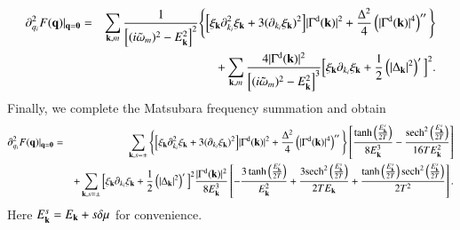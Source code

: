 \documentclass[aps,prd,amsmath,two column,nofootinbib,amssymb,referee]{revtex4}
\begin{document}
\begin{widetext}
\begin{eqnarray}\label{F2}
\partial_{q_i}^2F({\bf q})|_{\bf q=0}
&=&\sum_{{\bf k},m}{1\over\Big[(i\tilde\omega_m)^2-E_{\bf k}^2\Big]^2}\Bigg\{\Big[\xi_{\bf k}\partial_{k_i}^2\xi_{\bf k}+3(\partial_{k_i}\xi_{\bf k})^2\Big]|\Gamma^{\rm d}({\bf k})|^2+{\Delta^2\over4}\left(|\Gamma^{\rm d}({\bf k})|^4\right)''\Bigg\}\nonumber\\
&&+\sum_{{\bf k},m}{4|\Gamma^{\rm d}({\bf k})|^2\over\Big[(i\tilde\omega_m)^2-E_{\bf k}^2\Big]^3}\Big[\xi_{\bf k}\partial_{k_i}\xi_{\bf k}+{1\over2}\left(|\Delta_{\bf k}|^2\right)'\Big]^2.
\end{eqnarray}
Finally, we complete the Matsubara frequency summation and obtain
\begin{eqnarray}\label{F21}
\partial_{q_i}^2F({\bf q})|_{\bf q=0}&=&\sum_{{\bf k},s=\pm}\Bigg\{\Big[\xi_{\bf k}\partial_{k_i}^2\xi_{\bf k}+3(\partial_{k_i}\xi_{\bf k})^2\Big]|\Gamma^{\rm d}({\bf k})|^2+{\Delta^2\over4}
\left(|\Gamma^{\rm d}({\bf k})|^4\right)''\Bigg\}\left[{\tanh\left({E_{\bf k}^s\over2T}\right)\over8E_{\bf k}^3}-{{\rm sech}^2\left({E_{\bf k}^s\over2T}\right)\over16TE_{\bf k}^2}\right]\nonumber\\
&&+\sum_{{\bf k},s=\pm}\Big[\xi_{\bf k}\partial_{k_i}\xi_{\bf k}+{1\over2}\left(|\Delta_{\bf k}|^2\right)'\Big]^2\frac{|\Gamma^{\rm d}({\bf k})|^2}{8E_{\bf k}^3}
\left[-{3\tanh\left({E_{\bf k}^s\over2T}\right)\over E_{\bf k}^2}+{3{\rm sech}^2\left({E_{\bf k}^s\over2T}\right)\over 2TE_{\bf k}}+{\tanh\left({E_{\bf k}^s\over2T}\right){\rm sech}^2\left({E_{\bf k}^s\over2T}\right)\over2T^2}\right].
\end{eqnarray}
Here $E_{\bf k}^s=E_{\bf k}+s\delta\mu$ for convenience.



\end{widetext}
\end{document}
